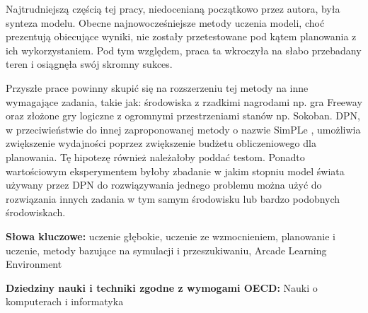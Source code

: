 Najtrudniejszą częścią tej pracy, niedocenianą początkowo przez autora, była synteza modelu. Obecne najnowocześniejsze metody uczenia modeli, choć prezentują obiecujące wyniki, nie zostały przetestowane pod kątem planowania z ich wykorzystaniem. Pod tym względem, praca ta wkroczyła na słabo przebadany teren i osiągnęła swój skromny sukces.

Przyszłe prace powinny skupić się na rozszerzeniu tej metody na inne wymagające zadania, takie jak: środowiska z rzadkimi nagrodami np. gra Freeway oraz złożone gry logiczne z ogromnymi przestrzeniami stanów np. Sokoban.
DPN, w przeciwieństwie do innej zaproponowanej metody o nazwie SimPLe \cite{Algo.SimPLe}, umożliwia zwiększenie wydajności poprzez zwiększenie budżetu obliczeniowego dla planowania. Tę hipotezę również należałoby poddać testom.
Ponadto wartościowym eksperymentem byłoby zbadanie w jakim stopniu model świata używany przez DPN do rozwiązywania jednego problemu można użyć do rozwiązania innych zadania w tym samym środowisku lub bardzo podobnych środowiskach.

\vspace{1cm}
\noindent
\textbf{Słowa kluczowe:} uczenie głębokie, uczenie ze wzmocnieniem, planowanie i uczenie, metody bazujące na symulacji i przeszukiwaniu, Arcade Learning Environment

\vspace{0.5cm}
\noindent
\textbf{Dziedziny nauki i techniki zgodne z wymogami OECD:} Nauki o komputerach i informatyka
